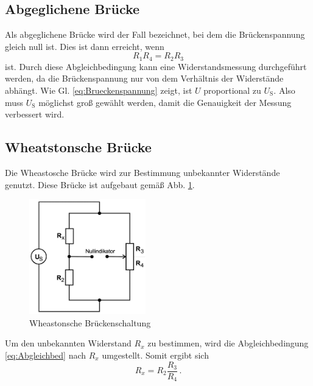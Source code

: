     \subsection{Abgeglichene Brücke}
    Als abgeglichene Brücke wird der Fall bezeichnet, bei dem die Brückenspannung gleich null ist.
    Dies ist dann erreicht, wenn
    \begin{equation}
        R_1 R_4 = R_2 R_3
        \label{eq:Abgleichbed}
    \end{equation}
    ist.
    Durch diese Abgleichbedingung kann eine Widerstandsmessung durchgeführt werden, da die Brückenspannung
    nur von dem Verhältnis der Widerstände abhängt.
    Wie Gl. \eqref{eq:Brueckenspannung} zeigt, ist $U$ proportional zu $U_{\text{S}}$.
    Also muss $U_{\text{S}}$ möglichst groß gewählt werden, damit die Genauigkeit der Messung verbessert wird.
    \subsection{Wheatstonsche Brücke}
    Die Wheastosche Brücke wird zur Bestimmung unbekannter Widerstände genutzt.
    Diese Brücke ist aufgebaut gemäß Abb. \ref{fig:Wheastonsche_Bruecke}.
    \begin{figure}
        \centering
        \includegraphics[height= 5cm]{Messdaten/Wheastonsche-Brueke.jpg}
        \caption{Wheastonsche Brückenschaltung}
        \label{fig:Wheastonsche_Bruecke}
    \end{figure}
    Um den unbekannten Widerstand $R_x$ zu bestimmen, wird die Abgleichbedingung \eqref{eq:Abgleichbed} nach $R_x$ umgestellt.
    Somit ergibt sich
    \begin{equation*}
        R_x = R_2 \frac{R_3}{R_4} \, \text{.}
    \end{equation*}
